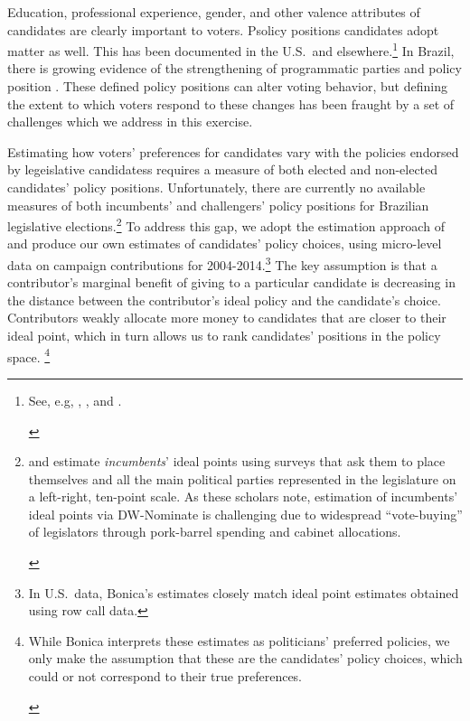 \documentclass[12pt,english]{article}
\newcommand{\note}[1]{\footnote{ \begin{doublespace}#1  \end{doublespace}}}
\numberwithin{equation}{section}
\theoremstyle{plain}
\theoremstyle{remark}
\theoremstyle{plain}
\begin{document}
Education, professional experience, gender, and other valence attributes of candidates are clearly important to voters. Psolicy positions candidates adopt matter as well. This has been documented in the U.S.\ and elsewhere.\note{\normalsize See, e.g, , \citeasnoun{AnsolabehereJones2010}, and \citeasnoun{Iaryczoweretal2018}.} In Brazil, there is growing evidence of the strengthening of programmatic parties and policy position . These defined policy positions can alter voting behavior, but defining the extent to which voters respond to these changes has been fraught by a set of challenges which we address in this exercise.

Estimating how voters' preferences for candidates vary with the policies endorsed by legeislative candidatess requires a measure of both elected and non-elected candidates' policy positions. Unfortunately, there are currently no available measures of both incumbents' and challengers' policy positions for Brazilian legislative elections.\note{\normalsize {} and \citeasnoun{ZuccoLauderdale2011} estimate \emph{incumbents}' ideal points using surveys that ask them to place themselves and all the main political parties represented in the legislature on a left-right, ten-point scale. As these scholars note, estimation of incumbents' ideal points via DW-Nominate is challenging due to widespread ``vote-buying'' of legislators through pork-barrel spending and cabinet allocations.} %
To address this gap, we adopt the estimation approach of  and produce our own estimates of candidates' policy choices, using micro-level data on campaign contributions for 2004-2014.\footnote{\normalsize In U.S.\ data, Bonica's estimates closely match ideal point estimates obtained using row call data.} The key assumption is that a contributor's marginal benefit of giving to a particular candidate is decreasing in the distance between the contributor's ideal policy and the candidate's choice. Contributors weakly allocate more money to candidates that are closer to their ideal point, which in turn allows us to rank candidates' positions in the policy space. \note{While Bonica interprets these estimates as politicians' preferred policies, we  only make the assumption that these are the candidates' policy choices, which could or not correspond to their true preferences.} 
    
\end{document}
